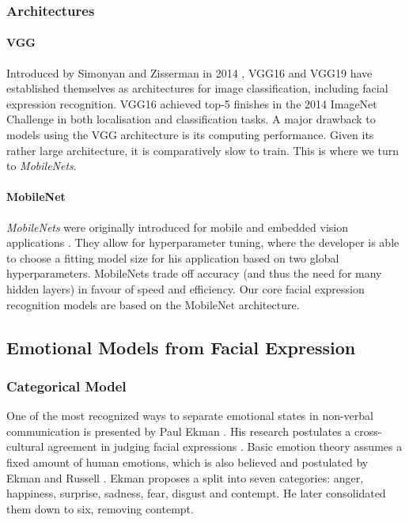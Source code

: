 \subsubsection{Architectures}
\paragraph{VGG}
Introduced by Simonyan and Zisserman in 2014 \cite{simonyan2015vgg}, VGG16 and VGG19 have established themselves as architectures for image classification, including facial expression recognition. VGG16 achieved top-5 finishes in the 2014 ImageNet Challenge in both localisation and classification tasks. A major drawback to models using the VGG architecture is its computing performance. Given its rather large architecture, it is comparatively slow to train. This is where we turn to \emph{MobileNets}.
\paragraph{MobileNet}
\emph{MobileNets} were originally introduced for mobile and embedded vision applications \cite{howard2017mobilenets}. They allow for hyperparameter tuning, where the developer is able to choose a fitting model size for his application based on two global hyperparameters. MobileNets trade off accuracy (and thus the need for many hidden layers) in favour of speed and efficiency. Our core facial expression recognition models are based on the MobileNet architecture.


\subsection{Emotional Models from Facial Expression}
\label{sub:rw_fer}
\subsubsection{Categorical Model}
One of the most recognized ways to separate emotional states in non-verbal communication is presented by Paul Ekman \cite{ekman1987universals} \cite{ekman2013emotion}. His research postulates a cross-cultural agreement in judging facial expressions \cite{ekman1987universals}. Basic emotion theory assumes a fixed amount of human emotions, which is also believed and postulated by Ekman and Russell \cite{ekman1992basic} \cite{russell2006}. Ekman proposes a split into seven categories: anger, happiness, surprise, sadness, fear, disgust and contempt. He later consolidated them down to six, removing contempt. 

